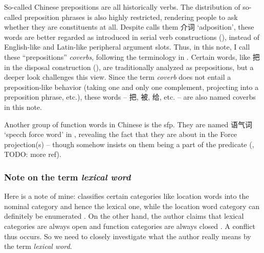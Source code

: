 \documentclass[UTF8, a4paper, oneside, scheme=plain]{ctexart}
\newcommand*{\citesec}[1]{\S~{#1}}
\newcommand*{\term}[1]{\emph{#1}}
\newcommand{\translate}[1]{`#1'}
\begin{document}
So-called Chinese prepositions are all historically verbs.
The distribution of so-called preposition phrases %
is also highly restricted,
rendering people to ask whether they are constituents at all.
Despite \citet{zhudexigrammar} calls them 介词 \translate{adposition},
these words are better regarded as introduced in serial verb constructions
(),
instead of English-like and Latin-like peripheral argument slots.
Thus, in this note, I call these ``prepositions'' \term{coverbs},
following the terminology in \citet{po2015chinese}.
Certain words, like 把 in the disposal construction (), 
are traditionally analyzed as prepositions,
but a deeper look challenges this view.
Since the term \term{coverb} does not entail 
a preposition-like behavior (taking one and only one complement, projecting into a preposition phrase, etc.),
these words -- 把, 被, 给, etc. -- 
are also named coverbs in this note.

Another group of function words in Chinese is the \ac{sfp}.
They are named 语气词 \translate{specch force word} in \citet{zhudexigrammar},
revealing the fact that they are about in the Force projection(s)
-- though \citet{zhudexigrammar} somehow insists on them being a part of the predicate
(, TODO: more ref).

\subsubsection{Note on the term \term{lexical word}}\label{sec:lexical-function-def}

Here is a note of mine: 
\citep[\citesec{3.6}]{zhudexigrammar} classifies 
certain categories like location words %
into the nominal category and hence the lexical one,
while the location word category can definitely be enumerated \citep[\citesec{4.4}]{zhudexigrammar}.
On the other hand, 
the author claims that lexical categories are always open 
and function categories are always closed \citet[\citesec{3.4}]{zhudexigrammar}.
A conflict thus occurs.
So we need to closely investigate what the author really means by the term \term{lexical word}.
\end{document}
